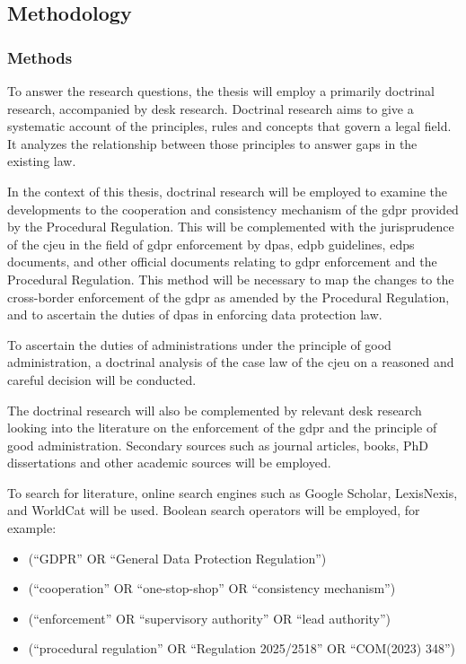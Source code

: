 \subsection{Methodology}
\label{sec:ch1-methodology}

\subsubsection{Methods}
\label{sec:ch1-methods}

To answer the research questions, the thesis will employ a primarily doctrinal research, accompanied by desk research. 
Doctrinal research aims to give a systematic account of the principles, rules and concepts that govern a legal field.\autocite[210]{smitsWhatLegalDoctrine2017}
It analyzes the relationship between those principles to answer gaps in the existing law.\autocite[210]{smitsWhatLegalDoctrine2017}

In the context of this thesis, doctrinal research will be employed to examine the developments to the cooperation and consistency mechanism of the \gls{gdpr} provided by the Procedural Regulation. 
This will be complemented with the jurisprudence of the \gls{cjeu} in the field of \gls{gdpr} enforcement by \glspl{dpa}, \gls{edpb} guidelines, \gls{edps} documents, and other official documents relating to \gls{gdpr} enforcement and the Procedural Regulation. 
This method will be necessary to map the changes to the cross-border enforcement of the \gls{gdpr} as amended by the Procedural Regulation, and to ascertain the duties of \glspl{dpa} in enforcing data protection law. 

To ascertain the duties of administrations under the principle of good administration, a doctrinal analysis of the case law of the \gls{cjeu} on a reasoned and careful decision will be conducted.

The doctrinal research will also be complemented by relevant desk research looking into the literature on the enforcement of the \gls{gdpr} and the principle of good administration.\autocite[223]{smitsWhatLegalDoctrine2017} 
Secondary sources such as journal articles, books, PhD dissertations and other academic sources will be employed. 

To search for literature, online search engines such as Google Scholar, LexisNexis, and WorldCat will be used. 
Boolean search operators will be employed, for example:
\begin{itemize}
    \item (``GDPR'' OR ``General Data Protection Regulation'')
    \item (``cooperation'' OR ``one-stop-shop'' OR ``consistency mechanism'')
    \item (``enforcement'' OR ``supervisory authority'' OR ``lead authority'')
    \item (``procedural regulation'' OR ``Regulation 2025/2518'' OR ``COM(2023) 348'')
\end{itemize}

